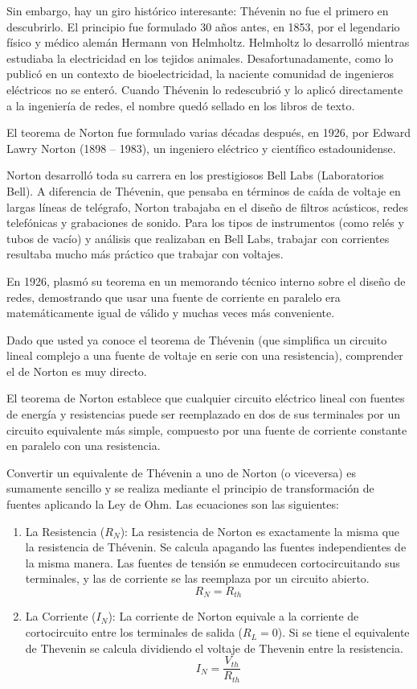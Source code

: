 Sin embargo, hay un giro histórico interesante: Thévenin no fue el primero en descubrirlo. El principio fue formulado 30 años antes, en 1853, por el legendario físico y médico alemán Hermann von Helmholtz. Helmholtz lo desarrolló mientras estudiaba la electricidad en los tejidos animales. Desafortunadamente, como lo publicó en un contexto de bioelectricidad, la naciente comunidad de ingenieros eléctricos no se enteró. Cuando Thévenin lo redescubrió y lo aplicó directamente a la ingeniería de redes, el nombre quedó sellado en los libros de texto.

El teorema de Norton fue formulado varias décadas después, en 1926, por Edward Lawry Norton (1898 -- 1983), un ingeniero eléctrico y científico estadounidense.

Norton desarrolló toda su carrera en los prestigiosos Bell Labs (Laboratorios Bell). A diferencia de Thévenin, que pensaba en términos de caída de voltaje en largas líneas de telégrafo, Norton trabajaba en el diseño de filtros acústicos, redes telefónicas y grabaciones de sonido. Para los tipos de instrumentos (como relés y tubos de vacío) y análisis que realizaban en Bell Labs, trabajar con corrientes resultaba mucho más práctico que trabajar con voltajes.

En 1926, plasmó su teorema en un memorando técnico interno sobre el diseño de redes, demostrando que usar una fuente de corriente en paralelo era matemáticamente igual de válido y muchas veces más conveniente.

Dado que usted ya conoce el teorema de Thévenin (que simplifica un circuito lineal complejo a una fuente de voltaje en serie con una resistencia), comprender el de Norton es muy directo.

El teorema de Norton establece que cualquier circuito eléctrico lineal con fuentes de energía y resistencias puede ser reemplazado en dos de sus terminales por un circuito equivalente más simple, compuesto por una fuente de corriente constante en paralelo con una resistencia.

Convertir un equivalente de Thévenin a uno de Norton (o viceversa) es sumamente sencillo y se realiza mediante el principio de transformación de fuentes aplicando la Ley de Ohm. Las ecuaciones son las siguientes:
\begin{enumerate}
  \item La Resistencia (\(R_N\)): La resistencia de Norton es exactamente la misma que la resistencia de Thévenin. Se calcula apagando las fuentes independientes de la misma manera. Las fuentes de tensión se enmudecen cortocircuitando sus terminales, y las de corriente se las reemplaza por un circuito abierto.
  \[
    R_N = R_{th}
  \]
  \item La Corriente (\(I_N\)): La corriente de Norton equivale a la corriente de cortocircuito entre los terminales de salida (\(R_L=0\)). Si se tiene el equivalente de Thevenin se calcula dividiendo el voltaje de Thevenin entre la resistencia.
  \[
    I_N = \frac{V_{th}}{R_{th}}
  \]
\end{enumerate}
